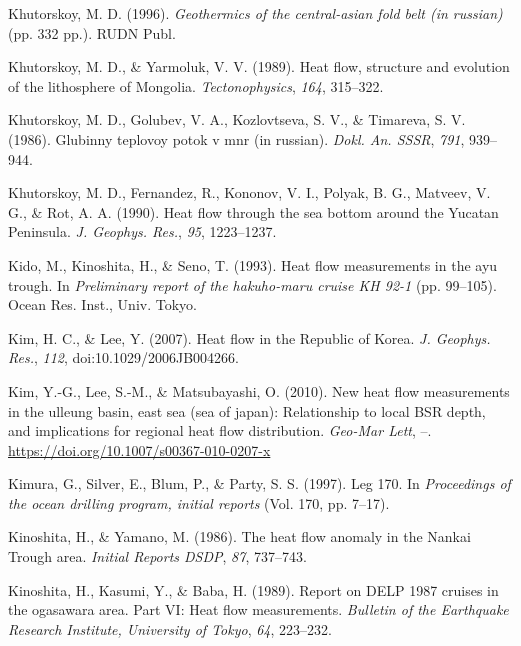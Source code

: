 \begin{CSLReferences}{1}{1}
\leavevmode{}%
Khutorskoy, M. D. (1996). \emph{Geothermics of the central-asian fold belt (in russian)} (pp. 332 pp.). RUDN Publ.

\leavevmode{}%
Khutorskoy, M. D., \& Yarmoluk, V. V. (1989). Heat flow, structure and evolution of the lithosphere of {Mongolia}. \emph{Tectonophysics}, \emph{164}, 315--322.

\leavevmode{}%
Khutorskoy, M. D., Golubev, V. A., Kozlovtseva, S. V., \& Timareva, S. V. (1986). Glubinny teplovoy potok v mnr (in russian). \emph{Dokl. An. SSSR}, \emph{791}, 939--944.

\leavevmode{}%
Khutorskoy, M. D., Fernandez, R., Kononov, V. I., Polyak, B. G., Matveev, V. G., \& Rot, A. A. (1990). Heat flow through the sea bottom around the {Yucatan Peninsula}. \emph{J. Geophys. Res.}, \emph{95}, 1223--1237.

\leavevmode{}%
Kido, M., Kinoshita, H., \& Seno, T. (1993). Heat flow measurements in the ayu trough. In \emph{Preliminary report of the hakuho-maru cruise KH 92-1} (pp. 99--105). Ocean Res. Inst., Univ. Tokyo.

\leavevmode{}%
Kim, H. C., \& Lee, Y. (2007). Heat flow in the {Republic of Korea}. \emph{J. Geophys. Res.}, \emph{112}, doi:10.1029/2006JB004266.

\leavevmode{}%
Kim, Y.-G., Lee, S.-M., \& Matsubayashi, O. (2010). New heat flow measurements in the ulleung basin, east sea (sea of japan): Relationship to local BSR depth, and implications for regional heat flow distribution. \emph{Geo-Mar Lett}, --. \url{https://doi.org/10.1007/s00367-010-0207-x}

\leavevmode{}%
Kimura, G., Silver, E., Blum, P., \& Party, S. S. (1997). Leg 170. In \emph{Proceedings of the ocean drilling program, initial reports} (Vol. 170, pp. 7--17).

\leavevmode{}%
Kinoshita, H., \& Yamano, M. (1986). The heat flow anomaly in the {Nankai Trough} area. \emph{Initial Reports DSDP}, \emph{87}, 737--743.

\leavevmode{}%
Kinoshita, H., Kasumi, Y., \& Baba, H. (1989). Report on DELP 1987 cruises in the ogasawara area. Part VI: Heat flow measurements. \emph{Bulletin of the Earthquake Research Institute, University of Tokyo}, \emph{64}, 223--232.


\end{CSLReferences}
